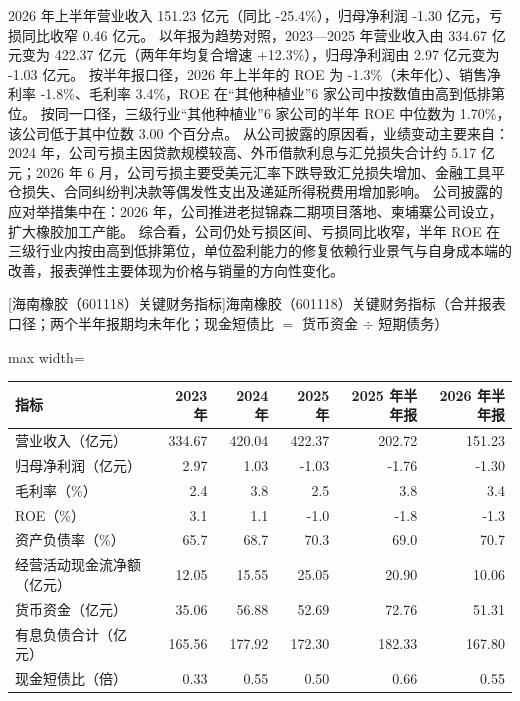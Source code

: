  2026 年上半年营业收入 151.23 亿元（同比 -25.4\%），归母净利润 -1.30 亿元，亏损同比收窄 0.46 亿元。 以年报为趋势对照，2023---2025 年营业收入由 334.67 亿元变为 422.37 亿元（两年年均复合增速 +12.3\%），归母净利润由 2.97 亿元变为 -1.03 亿元。 按半年报口径，2026 年上半年的 ROE 为 -1.3\%（未年化）、销售净利率 -1.8\%、毛利率 3.4\%，ROE 在“其他种植业”6 家公司中按数值由高到低排第位。 按同一口径，三级行业“其他种植业”6 家公司的半年 ROE 中位数为 1.70\%，该公司低于其中位数 3.00 个百分点。 从公司披露的原因看，业绩变动主要来自：2024 年，公司亏损主因贷款规模较高、外币借款利息与汇兑损失合计约 5.17 亿元；2026 年 6 月，公司亏损主要受美元汇率下跌导致汇兑损失增加、金融工具平仓损失、合同纠纷判决款等偶发性支出及递延所得税费用增加影响。 公司披露的应对举措集中在：2026 年，公司推进老挝锦森二期项目落地、柬埔寨公司设立，扩大橡胶加工产能。 综合看，公司仍处亏损区间、亏损同比收窄，半年 ROE 在三级行业内按由高到低排第位，单位盈利能力的修复依赖行业景气与自身成本端的改善，报表弹性主要体现为价格与销量的方向性变化。

\begin{center}\small\setlength{\tabcolsep}{3.4pt}
[海南橡胶（601118）关键财务指标]{海南橡胶（601118）关键财务指标（合并报表口径；两个半年报期均未年化；现金短债比 $=$ 货币资金 $\div$ 短期债务）}
\begin{adjustbox}{max width=\textwidth}
\begin{tabular}{@{}lrrrrr@{}}
\toprule
指标 & 2023 年 & 2024 年 & 2025 年 & 2025 年半年报 & 2026 年半年报 \\
\midrule
营业收入（亿元） & 334.67 & 420.04 & 422.37 & 202.72 & 151.23 \\
归母净利润（亿元） & 2.97 & 1.03 & -1.03 & -1.76 & -1.30 \\
毛利率（\%） & 2.4 & 3.8 & 2.5 & 3.8 & 3.4 \\
ROE（\%） & 3.1 & 1.1 & -1.0 & -1.8 & -1.3 \\
资产负债率（\%） & 65.7 & 68.7 & 70.3 & 69.0 & 70.7 \\
经营活动现金流净额（亿元） & 12.05 & 15.55 & 25.05 & 20.90 & 10.06 \\
货币资金（亿元） & 35.06 & 56.88 & 52.69 & 72.76 & 51.31 \\
有息负债合计（亿元） & 165.56 & 177.92 & 172.30 & 182.33 & 167.80 \\
现金短债比（倍） & 0.33 & 0.55 & 0.50 & 0.66 & 0.55 \\
\bottomrule
\end{tabular}
\end{adjustbox}
\end{center}

